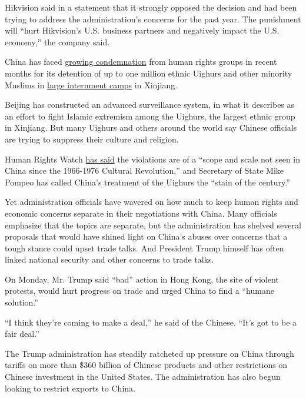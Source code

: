 Hikvision said in a statement that it strongly opposed the decision and
had been trying to address the administration's concerns for the past
year. The punishment will ``hurt Hikvision's U.S. business partners and
negatively impact the U.S. economy,'' the company said.

China has faced
\href{https://www.hrw.org/video-photos/interactive/2019/05/02/china-how-mass-surveillance-works-xinjiang}{growing
condemnation} from human rights groups in recent months for its
detention of up to one million ethnic Uighurs and other minority Muslims
in
\href{https://www.nytimes.com/2018/09/08/world/asia/china-uighur-muslim-detention-camp.html?module=inline}{large
internment camps} in Xinjiang.

Beijing has constructed an advanced surveillance system, in what it
describes as an effort to fight Islamic extremism among the Uighurs, the
largest ethnic group in Xinjiang. But many Uighurs and others around the
world say Chinese officials are trying to suppress their culture and
religion.

Human Rights Watch
\href{https://www.hrw.org/report/2018/09/09/eradicating-ideological-viruses/chinas-campaign-repression-against-xinjiangs}{has
said} the violations are of a ``scope and scale not seen in China since
the 1966-1976 Cultural Revolution,'' and Secretary of State Mike Pompeo
has called China's treatment of the Uighurs the ``stain of the
century.''

Yet administration officials have wavered on how much to keep human
rights and economic concerns separate in their negotiations with China.
Many officials emphasize that the topics are separate, but the
administration has shelved several proposals that would have shined
light on China's abuses over concerns that a tough stance could upset
trade talks. And President Trump himself has often linked national
security and other concerns to trade talks.

On Monday, Mr. Trump said ``bad'' action in Hong Kong, the site of
violent protests, would hurt progress on trade and urged China to find a
``humane solution.''

``I think they're coming to make a deal,'' he said of the Chinese.
``It's got to be a fair deal.''

The Trump administration has steadily ratcheted up pressure on China
through tariffs on more than \$360 billion of Chinese products and other
restrictions on Chinese investment in the United States. The
administration has also begun looking to restrict exports to China.

